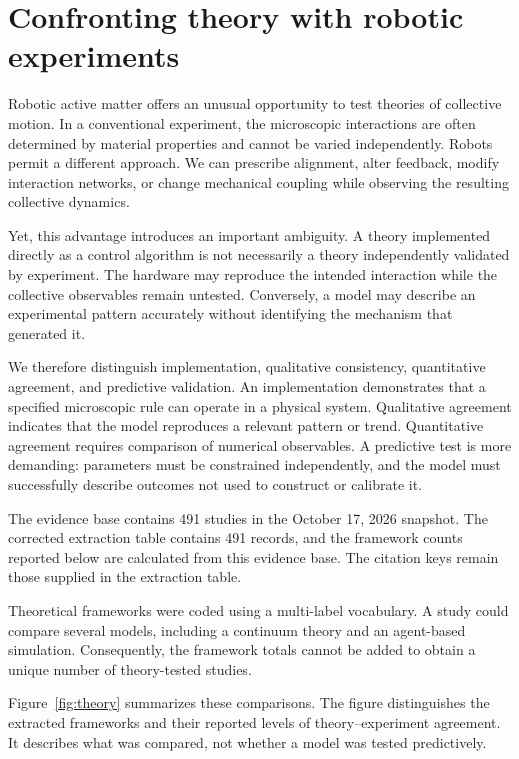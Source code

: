 \section{Confronting theory with robotic experiments}
\label{sec:theory}

Robotic active matter offers an unusual opportunity to test
theories of collective motion. In a conventional experiment,
the microscopic interactions are often determined by material
properties and cannot be varied independently. Robots permit
a different approach. We can prescribe alignment, alter
feedback, modify interaction networks, or change mechanical
coupling while observing the resulting collective dynamics.

Yet, this advantage introduces an important ambiguity.
A theory implemented directly as a control algorithm is
not necessarily a theory independently validated by
experiment. The hardware may reproduce the intended
interaction while the collective observables remain
untested. Conversely, a model may describe an experimental
pattern accurately without identifying the mechanism
that generated it.

We therefore distinguish implementation, qualitative
consistency, quantitative agreement, and predictive
validation. An implementation demonstrates that a
specified microscopic rule can operate in a physical
system. Qualitative agreement indicates that the
model reproduces a relevant pattern or trend.
Quantitative agreement requires comparison of numerical
observables. A predictive test is more demanding:
parameters must be constrained independently, and
the model must successfully describe outcomes
not used to construct or calibrate it.

The evidence base contains 491 studies in
the October 17, 2026 snapshot. The corrected
extraction table contains 491 records, and
the framework counts reported below are
calculated from this evidence base.
The citation keys remain those supplied
in the extraction table.

Theoretical frameworks were coded using a multi-label
vocabulary. A study could compare several models,
including a continuum theory and an agent-based
simulation. Consequently, the framework totals
cannot be added to obtain a unique number of
theory-tested studies.

Figure~\ref{fig:theory} summarizes these comparisons.
The figure distinguishes the extracted frameworks
and their reported levels of theory--experiment
agreement. It describes what was compared, not
whether a model was tested predictively.

